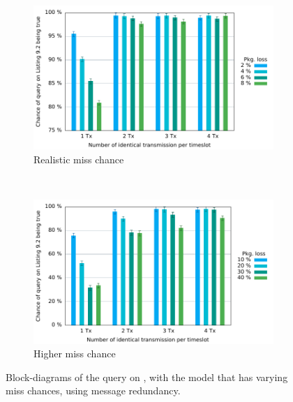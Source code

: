 \begin{figure}[p]
\begin{subfigure}{\linewidth}
\centering
\includegraphics{Figures/Graphs/gnuplot/ccucChance/graph2.pdf} 
\caption{Realistic miss chance}
\label{CCUC-Graph-UPPAAL}
\end{subfigure}\\
\begin{subfigure}{\linewidth}
\centering
\includegraphics{Figures/Graphs/gnuplot/ccucChance/graph3.pdf} 
\caption{Higher miss chance}
\label{fig:crazy_graph}
\end{subfigure}
\caption{Block-diagrams of the query on , with the model that has varying miss chances, using message redundancy.}
\end{figure} 


